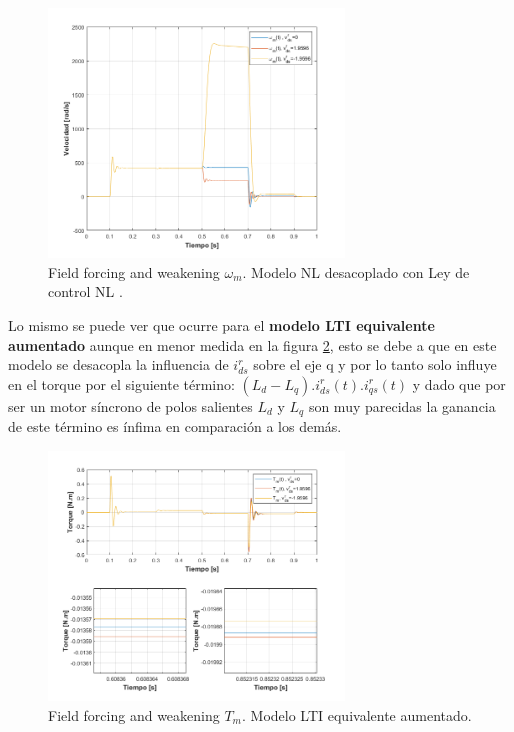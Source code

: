 \documentclass[10pt]{article}
\begin{document}
\begin{itemize}
	\begin{figure}[h!]
	\centering
	\includegraphics[width=0.7\textwidth]{wdistintode0.png}
	\caption{\label{fig:wdistintode0} Field forcing and weakening $\omega_{m}$. Modelo NL desacoplado con Ley de control NL .}
	\end{figure}
	
	Lo mismo se puede ver que ocurre para el \textbf{modelo LTI equivalente aumentado} aunque en menor medida en la figura \ref{fig:Tdistintode0LTI}, esto se debe a que en este modelo se desacopla la influencia de $i^{r}_{ds}$ sobre el eje q y por lo tanto solo influye en el torque por el siguiente término: $(L_{d}-L_{q}).i^{r}_{ds}(t).i^{r}_{qs}(t)$ y dado que por ser un motor síncrono de polos salientes $L_{d}$ y $L_{q}$ son muy parecidas la ganancia de este término es ínfima en comparación a los demás.
	
	\begin{figure}[h!]
	\centering
	\includegraphics[width=0.7\textwidth]{Tdistintode0LTI.png}
	\caption{\label{fig:Tdistintode0LTI} Field forcing and weakening $T_{m}$. Modelo LTI equivalente aumentado.}
	\end{figure}
\end{itemize}
\end{document}
